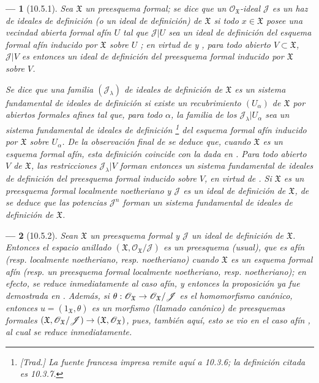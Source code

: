 \documentclass[oneside]{amsart}
\theoremstyle{ega-env-style}
\newtheorem*{env}{---}
\theoremstyle{ega-thm-env-style}
\theoremstyle{ega-defn-env-style}
\renewcommand{\to}{\mathchoice{\longrightarrow}{\rightarrow}{\rightarrow}{\rightarrow}}
\newcommand{\oldpage}[2][]{{\marginnote{\normalfont{\textbf{#1}~|~#2}}}\ignorespaces}
\let\EGAOriginalLabel\label
\renewcommand{\label}[1]{\phantomsection\EGAOriginalLabel{#1}}
\begin{document}
\begin{env}[10.5.1]
\label{I.10.5.1}
Sea $\mathfrak{X}$ un preesquema formal; se dice que un $\mathscr{O}_{\mathfrak{X}}$-ideal $\mathscr{J}$ es un \emph{haz de ideales de definición} (o un \emph{ideal de definición}) de $\mathfrak{X}$ si todo $x\in\mathfrak{X}$ posee una vecindad abierta formal afín $U$ tal que $\mathscr{J}|U$ sea un ideal de definición del esquema formal afín inducido por $\mathfrak{X}$ sobre $U$ ; en virtud de  y , para todo abierto $V\subset\mathfrak{X}$, $\mathscr{J}|V$ es entonces un ideal de definición del preesquema formal inducido por $\mathfrak{X}$ sobre $V$.

Se dice que una familia $(\mathscr{J}_\lambda)$ de ideales de definición de $\mathfrak{X}$ es un \emph{sistema fundamental}
\oldpage[I]{187}
\emph{de ideales de definición} si existe un recubrimiento $(U_\alpha)$ de $\mathfrak{X}$ por abiertos formales afines tal que, para todo $\alpha$, la familia de los $\mathscr{J}_\lambda|U_\alpha$ sea un sistema fundamental de ideales de definición \footnote{\emph{[Trad.] La fuente francesa impresa remite aquí a 10.3.6; la definición citada es 10.3.7.}} del esquema formal afín inducido por $\mathfrak{X}$ sobre $U_\alpha$.
De la observación final de  se deduce que, cuando $\mathfrak{X}$ es un esquema formal afín, esta definición coincide con la dada en .
Para todo abierto $V$ de $\mathfrak{X}$, las restricciones $\mathscr{J}_\lambda|V$ forman entonces un sistema fundamental de ideales de definición del preesquema formal inducido sobre $V$, en virtud de .
Si $\mathfrak{X}$ es un preesquema formal \emph{localmente noetheriano} y $\mathscr{J}$ es un ideal de definición de $\mathfrak{X}$, de  se deduce que las potencias $\mathscr{J}^n$ forman un sistema fundamental de ideales de definición de $\mathfrak{X}$.
\end{env}

\begin{env}[10.5.2]
\label{I.10.5.2}
Sean $\mathfrak{X}$ un preesquema formal y $\mathscr{J}$ un ideal de definición de $\mathfrak{X}$.
Entonces el espacio anillado $(\mathfrak{X},\mathscr{O}_{\mathfrak{X}}/\mathscr{J})$ es un \emph{preesquema} (usual), que es afín (resp. localmente noetheriano, resp. noetheriano) cuando $\mathfrak{X}$ es un esquema formal afín (resp. un preesquema formal localmente noetheriano, resp. noetheriano); en efecto, se reduce inmediatamente al caso afín, y entonces la proposición ya fue demostrada en .
Además, si $\theta:\mathscr{O}_{\mathfrak{X}}\to
\mathscr{O}_{\mathfrak{X}}/\mathscr{J}$ es el homomorfismo canónico, entonces $u=(1_{\mathfrak{X}},\theta)$ es un \emph{morfismo} (llamado \emph{canónico}) de preesquemas formales $(\mathfrak{X},\mathscr{O}_{\mathfrak{X}}/\mathscr{J})\to
(\mathfrak{X},\mathscr{O}_{\mathfrak{X}})$, pues, también aquí, esto se vio en el caso afín , al cual se reduce inmediatamente.
\end{env}
\end{document}
